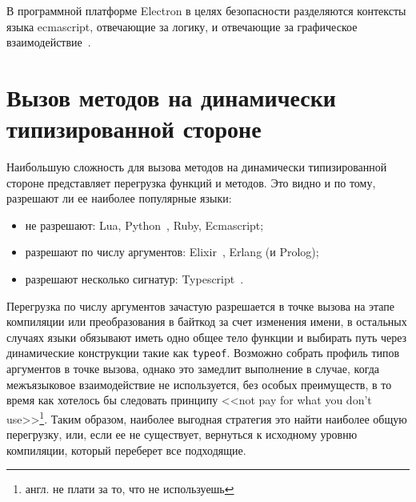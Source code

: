 \documentclass[times
]{itmo-student-thesis}
\begin{document}
В программной платформе Electron в целях безопасности разделяются контексты языка ecmascript, отвечающие за логику, и отвечающие за графическое взаимодействие~\cite{electron-isolates}.

\section{Вызов методов на динамически типизированной стороне}
Наибольшую сложность для вызова методов на динамически типизированной стороне представляет перегрузка функций и методов. Это видно и по тому, разрешают ли ее наиболее популярные языки:
\begin{itemize}
	\item не разрешают: Lua, Python~\cite{overload-python}, Ruby, Ecmascript;
	\item разрешают по числу аргументов: Elixir~\cite{overload-elixir}, Erlang (и Prolog);
	\item разрешают несколько сигнатур: Typescript~\cite{overload-typescript}.
\end{itemize}

Перегрузка по числу аргументов зачастую разрешается в точке вызова на этапе компиляции или преобразования в байткод за счет изменения имени, в остальных случаях языки обязывают иметь одно общее тело функции и выбирать путь через динамические конструкции такие как \texttt{typeof}. Возможно собрать профиль типов аргументов в точке вызова, однако это замедлит выполнение в случае, когда межъязыковое взаимодействие не используется, без особых преимуществ, в то время как хотелось бы следовать принципу <<not pay for what you don't use>>\footnote{англ. не плати за то, что не используешь}. Таким образом, наиболее выгодная стратегия это найти наиболее общую перегрузку, или, если ее не существует, вернуться к исходному уровню компиляции, который переберет все подходящие.
\end{document}
